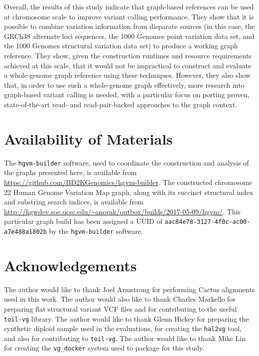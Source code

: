 Overall, the results of this study indicate that graph-based references can be used at chromosome scale to improve variant calling performance. They show that it is possible to combine variation information from disparate sources (in this case, the GRCh38 alternate loci sequences, the 1000 Genomes point variation data set, and the 1000 Genomes structural variation data set) to produce a working graph reference. They show, given the construction runtimes and resource requirements achieved at this scale, that it would not be impractical to construct and evaluate a whole-genome graph reference using these techniques. However, they also show that, in order to use such a whole-genome graph effectively, more research into graph-based variant calling is needed, with a particular focus on porting proven, state-of-the-art read- and read-pair-backed approaches to the graph context.


\section{Availability of Materials}

The \texttt{hgvm-builder} software, used to coordinate the construction and analysis of the graphs presented here, is available from \url{https://github.com/BD2KGenomics/hgvm-builder}. The constructed chromosome 22 Human Genome Variation Map graph, along with its succinct structural index and substring search indices, is available from \url{http://hgwdev.soe.ucsc.edu/~anovak/outbox/builds/2017-05-09/hgvm/}. This particular graph build has been assigned a UUID of \texttt{aac84e78-3127-4f0c-ac00-a7e488a1802b} by the \texttt{hgvm-builder} software.

\section{Acknowledgements}

The author would like to thank Joel Armstrong for performing Cactus alignments used in this work. The author would also like to thank Charles Markello for preparing flat structural variant VCF files and for contributing to the useful \texttt{toil-vg} library. The author would like to thank Glenn Hickey for preparing the synthetic diploid sample used in the evaluations, for creating the \texttt{hal2vg} tool, and also for contributing to \texttt{toil-vg}. The author would like to thank Mike Lin for creating the \texttt{vg\_docker} system used to package \vg for this study.

